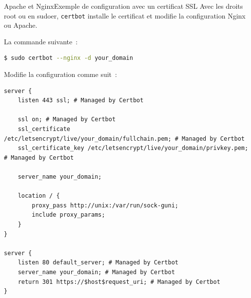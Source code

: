 \documentclass{beamer}
\begin{document}
    \begin{frame}[fragile]{Apache et Nginx}{Exemple de configuration avec un certificat SSL}
        Avec les droits root ou en sudoer, \lstinline{certbot} installe le certificat et modifie la configuration Nginx ou Apache.

        La commande suivante~:
        \begin{lstlisting}[language=bash,basicstyle=\ttfamily\tiny]
$ sudo certbot --nginx -d your_domain
        \end{lstlisting}
        Modifie la configuration comme suit~:
        \begin{lstlisting}[basicstyle=\ttfamily\tiny]
server {
    listen 443 ssl; # Managed by Certbot

    ssl on; # Managed by Certbot
    ssl_certificate     /etc/letsencrypt/live/your_domain/fullchain.pem; # Managed by Certbot
    ssl_certificate_key /etc/letsencrypt/live/your_domain/privkey.pem; # Managed by Certbot

    server_name your_domain;

    location / {
        proxy_pass http://unix:/var/run/sock-guni;
        include proxy_params;
    }
}

server {
    listen 80 default_server; # Managed by Certbot
    server_name your_domain; # Managed by Certbot
    return 301 https://$host$request_uri; # Managed by Certbot
}
        \end{lstlisting}
    \end{frame}
\end{document}

